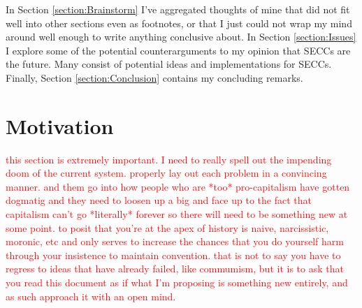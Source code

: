 \documentclass{article}[10pt]
\begin{document}
In Section \ref{section:Brainstorm} I've aggregated thoughts of mine that did not fit well into other sections even as footnotes, or that I just could not wrap my mind around well enough to write anything conclusive about. 
In Section \ref{section:Issues} I explore some of the potential counterarguments to my opinion that SECCs are the future.
Many consist of potential ideas and implementations for SECCs.
Finally, Section \ref{section:Conclusion} contains my concluding remarks.


\section{Motivation}
\label{section:Motivation}

\textcolor{red}{this section is extremely important. 
I need to really spell out the impending doom of the current system. 
properly lay out each problem in a convincing manner. and them go into how people who are *too* pro-capitalism have gotten dogmatig and they need to loosen up a big and face up to the fact that capitalism can't go *literally* forever so there will need to be something new at some point. 
to posit that you're at the apex of history is naive, narcissistic, moronic, etc and only serves to increase the chances that you do yourself harm through your insistence to maintain convention. 
that is not to say you have to regress to ideas that have already failed, like commumism, but it is to ask that you read this document as if what I'm proposing is something new entirely, and as such approach it with an open mind.} \\
\end{document}
